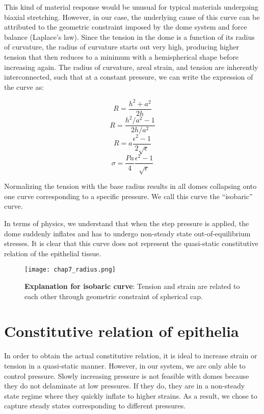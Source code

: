 This kind of material response would be unusual for typical materials
undergoing biaxial stretching. However, in our case, the underlying
cause of this curve can be attributed to the geometric constraint
imposed by the dome system and force balance (Laplace's law). Since the
tension in the dome is a function of its radius of curvature, the radius
of curvature starts out very high, producing higher tension that then
reduces to a minimum with a hemispherical shape before increasing again.
The radius of curvature, areal strain, and tension are inherently
interconnected, such that at a constant pressure, we can write the
expression of the curve as:

\[ R = \frac{h^2 + a^2}{2h} \] \[ R = \frac{h^2/a^2 - 1}{2h/a^2} \]
\[ R = a\frac{\epsilon^2 - 1}{2\sqrt{\epsilon}} \]
\[ \sigma = \frac{Pa}{4} \frac{\epsilon^2 - 1}{\sqrt{\epsilon}}\]

Normalizing the tension with the base radius results in all domes
collapsing onto one curve corresponding to a specific pressure. We call
this curve the ``isobaric'' curve.

In terms of physics, we understand that when the step pressure is
applied, the dome suddenly inflates and has to undergo non-steady state
out-of-equilibrium stresses. It is clear that this curve does not
represent the quasi-static constitutive relation of the epithelial
tissue.

\begin{figure}
	\centering
	\texttt{[image: chap7\_radius.png]}
	\caption{\label{fig_7_4} \textbf{Explanation for isobaric curve}: Tension and strain are related to each other through geometric constraint of spherical cap.
	}
\end{figure}



\hypertarget{constitutive-relation-of-epithelia}{%
	\section{Constitutive relation of
		epithelia}\label{constitutive-relation-of-epithelia}}

In order to obtain the actual constitutive relation, it is ideal to
increase strain or tension in a quasi-static manner. However, in our
system, we are only able to control pressure. Slowly increasing pressure
is not feasible with domes because they do not delaminate at low
pressures. If they do, they are in a non-steady state regime where they
quickly inflate to higher strains. As a result, we chose to capture
steady states corresponding to different pressures.

